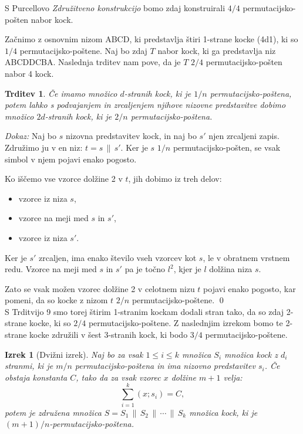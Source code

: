 \documentclass[a4paper, 12pt]{article}
\newtheorem{izrek}[definicija]{Izrek}
\newtheorem{trditev}[definicija]{Trditev}
\begin{document}
S Purcellovo {\em Združitveno konstrukcijo} bomo zdaj konstruirali $4/4$ permutacijsko-pošten nabor kock.

Začnimo z osnovnim nizom ABCD, ki predstavlja štiri 1-strane kocke (4d1), ki so $1/4$ permutacijsko-poštene. Naj bo zdaj $T$ nabor kock, ki ga predstavlja niz ABCDDCBA. Naslednja trditev nam pove, da je $T$ $2/4$ permutacijsko-pošten nabor 4 kock.

\begin{trditev}
Če imamo množico $d$-stranih kock, ki je $1/n$ permutacijsko-poštena, potem lahko s podvajanjem in zrcaljenjem njihove nizovne predstavitve dobimo množico $2d$-stranih kock, ki je $2/n$ permutacijsko-poštena.
\end{trditev}

{\em Dokaz:\/}
Naj bo $s$ nizovna predstavitev kock, in naj bo $s'$ njen zrcaljeni zapis. Združimo ju v en niz: $t = s \,\|\, s'$. Ker je $s$ $1/n$ permutacijsko-pošten, se vsak simbol v njem pojavi enako pogosto.

Ko iščemo vse vzorce dolžine 2 v $t$, jih dobimo iz treh delov:
\begin{itemize}
  \item vzorce iz niza $s$,
  \item vzorce na meji med $s$ in $s'$,
  \item vzorce iz niza $s'$.
\end{itemize}

Ker je $s'$ zrcaljen, ima enako število vseh vzorcev kot $s$, le v obratnem vrstnem redu. Vzorce na meji med $s$ in $s'$ pa je točno $l^2$, kjer je $l$ dolžina niza $s$.

Zato se vsak možen vzorec dolžine 2 v celotnem nizu $t$ pojavi enako pogosto, kar pomeni, da so kocke z nizom $t$ $2/n$ permutacijsko-poštene.
\qed\\

S Trditvijo 9 smo torej štirim 1-stranim kockam dodali stran tako, da so zdaj 2-strane kocke, ki so $2/4$ permutacijsko-poštene. Z naslednjim izrekom bomo te 2-strane kocke združili v šest 3-stranih kock, ki bodo $3/4$ permutacijsko-poštene.

\begin{izrek}[Dvižni izrek]
Naj bo za vsak $1 \le i \le k$ množica $S_i$ množica kock z $d_i$ stranmi, ki je $m/n$ permutacijsko-poštena in ima nizovno predstavitev $s_i$. Če obstaja konstanta $C$, tako da za vsak vzorec $x$ dolžine $m + 1$ velja:
\[
\sum_{i=1}^{k} (x; s_i) = C,
\]
potem je združena množica $S = S_1 \,\|\, S_2 \,\|\, \cdots \,\|\, S_k$ množica kock, ki je $(m+1)/n$-permuta\-cijsko-poštena.
\end{izrek}
\end{document}

